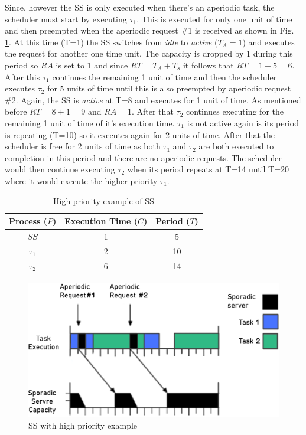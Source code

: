 \documentclass[conference]{IEEEtran}
\begin{document}
Since, however the SS is only executed when there's an aperiodic task, the scheduler must start by executing $\tau_1$. This is executed for only one unit of time and then preempted when the aperiodic request \#1 is received as shown in Fig. \ref{fig:high priority ss graph}. At this time (T=1) the SS switches from \textit{idle} to \textit{active} ($T_A = 1$) and executes the request for another one time unit. The capacity is dropped by 1 during this period so $RA$ is set to 1 and since $RT = T_A + T_s$ it follows that $RT= 1+5=6$. After this $\tau_1$ continues the remaining 1 unit of time and then the scheduler executes $\tau_2$ for 5 units of time until this is also preempted by aperiodic request \#2. Again, the SS is \textit{active} at T=8 and executes for 1 unit of time. As mentioned before $RT= 8+1=9$ and $RA=1$. After that $\tau_2$ continues executing for the remaining 1 unit of time of it's execution time. $\tau_1$ is not active again is its period is repeating (T=10) so it executes again for 2 units of time. After that the scheduler is free for 2 units of time as both $\tau_1$ and $\tau_2$ are both executed to completion in this period and there are no aperiodic requests. The scheduler would then continue executing $\tau_2$ when its period repeats at T=14 until T=20 where it would execute the higher priority $\tau_1$.
\begin{table}[h]
    \centering
    \begin{tabular}{ |c|c|c| } 
    \hline
        Process ($P$) & Execution Time ($C$) & Period ($T$)\\
        \hline\hline
         ${SS}$& 1 & 5 \\
         \hline
         ${\tau_1}$& 2 & 10 \\
         \hline
         ${\tau_2}$& 6 & 14 \\
         \hline
         
    \end{tabular}
    \vspace{1em}
    \caption{High-priority example of SS}
    \label{tab:high priority ss table}
\end{table}
\begin{figure}[h]
    \centering
    \includegraphics[scale=0.3]{high priority ss.png}
    \caption{SS with high priority example}
    \label{fig:high priority ss graph}
\end{figure}
\end{document}
